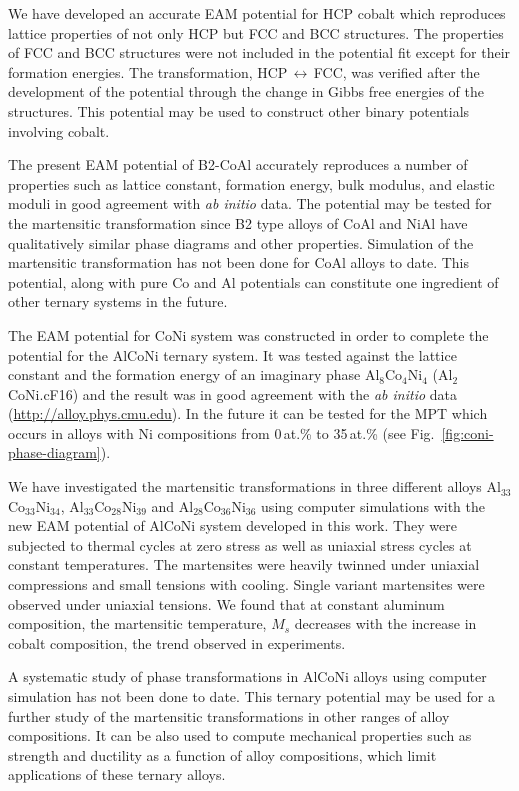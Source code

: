 We have developed an accurate EAM potential for HCP cobalt which reproduces lattice properties of not only HCP but FCC and BCC structures. The properties of FCC and BCC structures were not included in the potential fit except for their formation energies. The transformation, HCP\,$\leftrightarrow$\,FCC, was verified after the development of the potential through the change in Gibbs free energies of the structures. This potential may be used to construct other binary potentials involving cobalt.

The present EAM potential of B2-CoAl accurately reproduces a number of properties such as lattice constant, formation energy, bulk modulus, and elastic moduli in good agreement with \emph{ab initio} data. The potential may be tested for the martensitic transformation since B2 type alloys of CoAl and NiAl have qualitatively similar phase diagrams and other properties. Simulation of the martensitic transformation has not been done for CoAl alloys to date. This potential, along with pure Co and Al potentials can constitute one ingredient of other ternary systems in the future.

The EAM potential for CoNi system was constructed in order to complete the potential for the AlCoNi ternary system. It was tested against the lattice constant and the formation energy of an imaginary phase Al$_8$Co$_4$Ni$_4$ (Al$_2$CoNi.cF16) and the result was in good agreement with the \emph{ab initio} data (\url{http://alloy.phys.cmu.edu}). In the future it can be tested for the MPT which occurs in alloys with Ni compositions from 0\,at.\% to 35\,at.\% (see Fig.\ \ref{fig:coni-phase-diagram}).

We have investigated the martensitic transformations in three different alloys Al$_{33}$Co$_{33}$Ni$_{34}$, Al$_{33}$Co$_{28}$Ni$_{39}$ and Al$_{28}$Co$_{36}$Ni$_{36}$ using computer simulations with the new EAM potential of \mbox{AlCoNi} system developed in this work. They were subjected to thermal cycles at zero stress as well as uniaxial stress cycles at constant temperatures. The martensites were heavily twinned under uniaxial compressions and small tensions with cooling. Single variant martensites were observed under uniaxial tensions. We found that at constant aluminum composition, the martensitic temperature, $M_s$ decreases with the increase in cobalt composition, the trend observed in experiments. 

A systematic study of phase transformations in AlCoNi alloys using computer simulation has not been done to date. This ternary potential may be used for a further study of the martensitic transformations in other ranges of alloy compositions. It can be also used to compute mechanical properties such as strength and ductility as a function of alloy compositions, which limit applications of these ternary alloys.


